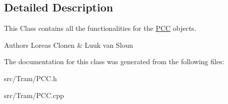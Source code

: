 \subsection{Detailed Description}
This Class contains all the functionalities for the \hyperlink{classPCC}{P\+CC} objects. 

\begin{DoxyAuthor}{Authors}
Loreas Clonen \& Luuk van Sloun 
\end{DoxyAuthor}


The documentation for this class was generated from the following files\+:\begin{DoxyCompactItemize}
\item 
src/\+Tram/P\+C\+C.\+h\item 
src/\+Tram/P\+C\+C.\+cpp\end{DoxyCompactItemize}
